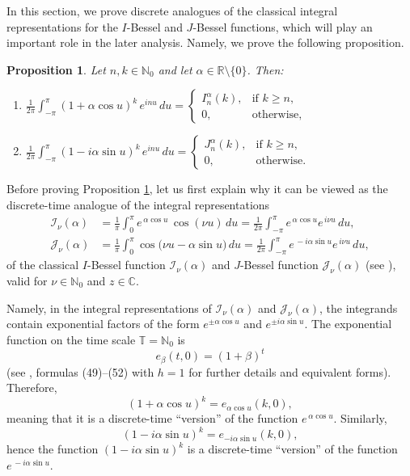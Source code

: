 \documentclass[12pt]{amsart}
\numberwithin{equation}{section}
\newtheorem{proposition}[theorem]{Proposition}
\theoremstyle{boldremark}
\begin{document}
In this section, we prove discrete analogues of the classical integral representations for the $I$-Bessel and $J$-Bessel functions, which will play an important role in the later analysis. Namely, we prove the following proposition.

\begin{proposition}\label{prop:IJ-int}
Let $n,k\in\mathbb{N}_0$ and let $\alpha\in \mathbb{R} \setminus \{0\}$. Then:
\begin{enumerate}[label=\textup{(\roman*)}]
\item \label{prop:IJ-int-i} $\displaystyle
\frac{1}{2\pi}\int_{-\pi}^{\pi} (1+\alpha\cos u)^{k}\,e^{inu}\,du
=
\begin{cases}
I_{n}^{\alpha}(k), & \text{if } k\ge n,\\[4pt]
0, & \text{otherwise,}
\end{cases}$

\item \label{prop:IJ-int-ii} $\displaystyle
\frac{1}{2\pi}\int_{-\pi}^{\pi} (1-i\alpha\sin u)^{k}\,e^{inu}\,du
=
\begin{cases}
J_{n}^{\alpha}(k), & \text{if } k\ge n,\\[4pt]
0, & \text{otherwise.}
\end{cases}$
\end{enumerate}
\end{proposition}

Before proving Proposition \ref{prop:IJ-int}, let us first explain why it can be viewed as the discrete-time analogue of the integral representations
$$
\begin{aligned}
\mathcal I_\nu(\alpha) &= \frac{1}{\pi}\int_{0}^{\pi} e^{\,\alpha\cos u}\,\cos(\nu u)\,du= \frac{1}{2\pi}\int_{-\pi}^{\pi} e^{\,\alpha\cos u}e^{\,i\nu u}\,du,\\
\mathcal J_\nu(\alpha) &= \frac{1}{\pi}\int_{0}^{\pi}\cos\!\big(\nu u - \alpha\sin u\big)\,du
= \frac{1}{2\pi}\int_{-\pi}^{\pi} e^{\,-i \alpha\sin u}e^{\,i\nu u}\,du,
\end{aligned}
$$
of the classical $I$-Bessel function $\mathcal I_\nu(\alpha)$ and $J$-Bessel function $\mathcal J_\nu(\alpha) $ (see \cite[8.431.5 and 8.411.1]{GR}), valid for $\nu\in\mathbb{N}_0$ and $z\in\mathbb{C}$.

Namely, in the integral representations of $\mathcal I_\nu(\alpha)$ and $\mathcal J_\nu(\alpha) $, the integrands contain exponential factors of the form $e^{\pm \alpha\cos u}$ and $e^{\pm i \alpha\sin u}$. The exponential function on the time scale $\mathbb{T}=\mathbb{N}_0$ is
$$
e_\beta(t,0)=(1+\beta)^{t}
$$
(see \cite{Cu15}, formulas (49)--(52) with $h=1$  for further details and equivalent forms). Therefore, $$(1+\alpha\cos u)^{k}=e_{\alpha \cos u}(k,0),$$ meaning that it is a discrete-time ``version'' of the function $e^{\,\alpha \cos u}$. Similarly, $$(1-i\alpha\sin u)^{k}= e_{-i\alpha \sin u}(k,0),$$ hence the function $(1-i\alpha\sin u)^{k}$ is a discrete-time ``version'' of the function $ e^{\,-i \alpha\sin u}$.
\end{document}
